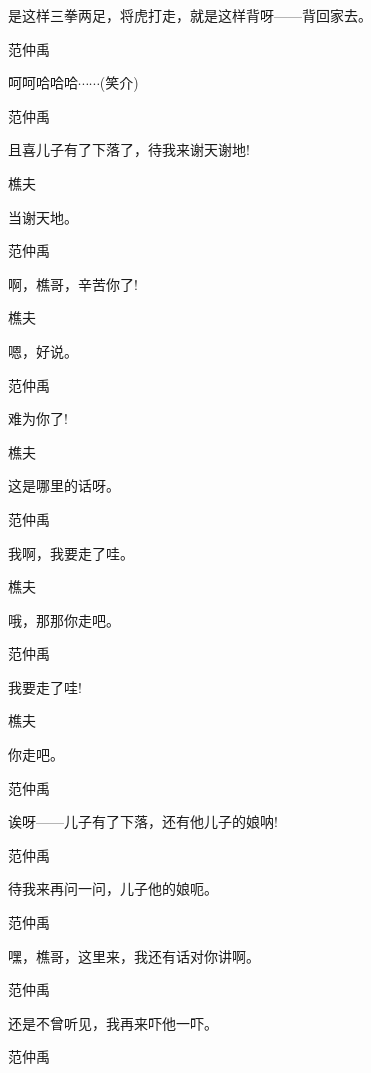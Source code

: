 是这样三拳两足，将虎打走，就是这样背呀------背回家去。

范仲禹\hspace{20pt}~

呵呵哈哈哈$\cdots{}\cdots{}$(笑介)

范仲禹\hspace{20pt}~

且喜儿子有了下落了，待我来谢天谢地!

樵夫\hspace{30pt}~

当谢天地。

范仲禹\hspace{20pt}~

啊，樵哥，辛苦你了!

樵夫\hspace{30pt}~

嗯，好说。

范仲禹\hspace{20pt}~

难为你了!

樵夫\hspace{30pt}~

这是哪里的话呀。

范仲禹\hspace{20pt}~

我啊，我要走了哇。

樵夫\hspace{30pt}~

哦，那那你走吧。

范仲禹\hspace{20pt}~

我要走了哇!

樵夫\hspace{30pt}~

你走吧。

范仲禹\hspace{20pt}~

诶呀------儿子有了下落，还有他儿子的娘呐!

范仲禹\hspace{20pt}~

待我来再问一问，儿子他的娘呃。

范仲禹\hspace{20pt}~

嘿，樵哥，这里来，我还有话对你讲啊。

范仲禹\hspace{20pt}~

还是不曾听见，我再来吓他一吓。

范仲禹\hspace{20pt}~

